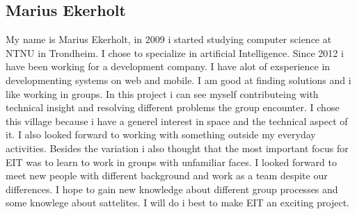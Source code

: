 \subsection{Marius Ekerholt}

My name is Marius Ekerholt, in 2009 i started studying computer science at NTNU in Trondheim. I chose to  specialize in artificial Intelligence. Since 2012 i have been working for a development company. I have alot of exsperience in developmenting systems on web and mobile. I am good at finding solutions and i like working in groups. In this project i can see myself contributeing with technical insight and resolving different problems the group encounter. 
I chose this village because i have a generel interest in space and the technical aspect of it. I also looked forward to working with something outside my everyday activities. Besides the variation i also thought that the most important focus for EIT was to learn to work in groups with unfamiliar faces. I looked forward to meet new people with different background and work as a team despite our differences. I hope to gain new knowledge about different group processes and some knowlege about sattelites. I will do i best to make EIT an exciting project. 
 